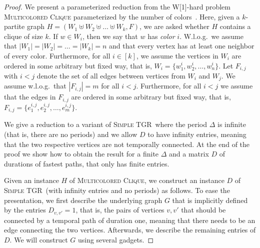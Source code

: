\documentclass[a4paper,UKenglish,cleveref, autoref, thm-restate,anonymous]{lipics-v2021}
\newcommand{\deltaExact}{\textsc{Simple TGR}}
\begin{document}
\begin{proof}
    We present a parameterized reduction from the W[1]-hard problem \textsc{Multicolored Clique} parameterized by the number of colors~\cite{fellows2009multipleinterval}.  Here, given a $k$-partite graph $H=(W_1\uplus W_2 \uplus\ldots\uplus W_k, F)$, we are asked whether $H$ contains a clique of size $k$. If $w\in W_i$, then we say that $w$ has \emph{color} $i$. W.l.o.g.\ we assume that $|W_1|=|W_2|=\ldots=|W_k|=n$ and that every vertex has at least one neighbor of every color. 
    Furthermore, for all $i\in[k]$, we assume the vertices in $W_i$ are ordered in some arbitrary but fixed way, that is, $W_i=\{w^i_1,w^i_2,\ldots,w^i_n\}$.
    Let $F_{i,j}$ with $i<j$ denote the set of all edges between vertices from $W_i$ and $W_j$. We assume w.l.o.g.\ that $|F_{i,j}|=m$ for all $i< j$.
    Furthermore, for all $i<j$ we assume that the edges in $F_{i,j}$ are ordered in some arbitrary but fixed way, that is, $F_{i,j}=\{e^{i,j}_1,e^{i,j}_2,\ldots,e^{i,j}_m\}$.

We give a reduction to a variant of \deltaExact\ where the period $\Delta$ is infinite (that is, there are no periods) and we allow $D$ to have infinity entries, meaning that the two respective vertices are not temporally connected. At the end of the proof we show how to obtain the result for a finite $\Delta$ and a matrix $D$ of durations of fastest paths, that only has finite entries.

    Given an instance $H$ of \textsc{Multicolored Clique}, we construct an instance $D$ of \deltaExact\ (with infinity entries and no periods) as follows. To ease the presentation, we first describe the underlying graph $G$ that is implicitly defined by the entries $D_{v,v'}=1$, that is, the pairs of vertices $v,v'$ that should be connected by a temporal path of duration one, meaning that there needs to be an edge connecting the two vertices. Afterwards, we describe the remaining entries of $D$.
    We will construct $G$ using several gadgets. 
    

\end{proof}
\end{document}
